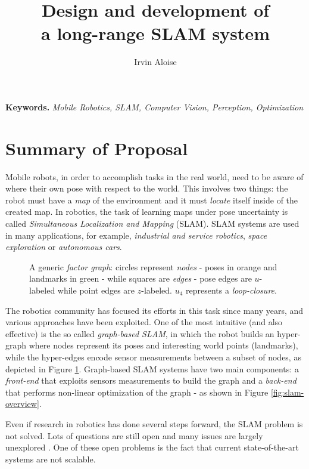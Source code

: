 \documentclass[10pt,a4paper, notitlepage]{report}
\title{Design and development of \\ a long-range SLAM system}
\author{Irvin Aloise}
\begin{document}
\maketitle


\textbf{Keywords.} \textit{Mobile Robotics, SLAM, Computer Vision, Perception, Optimization}


\section*{Summary of Proposal}
Mobile robots, in order to accomplish tasks in the real world, need to be aware of where their own pose with respect to the world. This involves two things: the robot must have a \textit{map} of the environment and it must \textit{locate} itself inside of the created map. In robotics, the task of learning maps under pose uncertainty is called \textit{Simultaneous Localization and Mapping} (SLAM). SLAM systems are used in many applications, for example, \textit{industrial and service robotics}, \textit{space exploration} or \textit{autonomous cars}. 

\begin{figure}[h]
    \centering
    \resizebox{0.8\textwidth}{!}{}
    \caption{A generic \textit{factor graph}: circles represent \textit{nodes} - poses in orange and landmarks in green -  while squares are \textit{edges} - pose edges are $u$-labeled while point edges are $z$-labeled. $u_4$ represents a \textit{loop-closure}.}
    \label{fig:graph}
\end{figure}

The robotics community has focused its efforts in this task since many years, and various approaches have been exploited. One of the most intuitive (and also effective) is the so called \textit{graph-based SLAM}\cite{lu1997globally}, in which the robot builds an hyper-graph where nodes represent its poses and interesting world points (landmarks), while the hyper-edges encode sensor measurements between a subset of nodes, as depicted in Figure \ref{fig:graph}. Graph-based SLAM systems have two main components: a \textit{front-end} that exploits sensors measurements to build the graph and a \textit{back-end} that performs non-linear optimization of the graph - as shown in Figure \ref{fig:slam-overview}. 

Even if research in robotics has done several steps forward, the SLAM problem is not solved. Lots of questions are still open and many issues are largely unexplored \cite{carlone2016slam-survey}. One of these open problems is the fact that current state-of-the-art systems are not scalable. 
\end{document}
